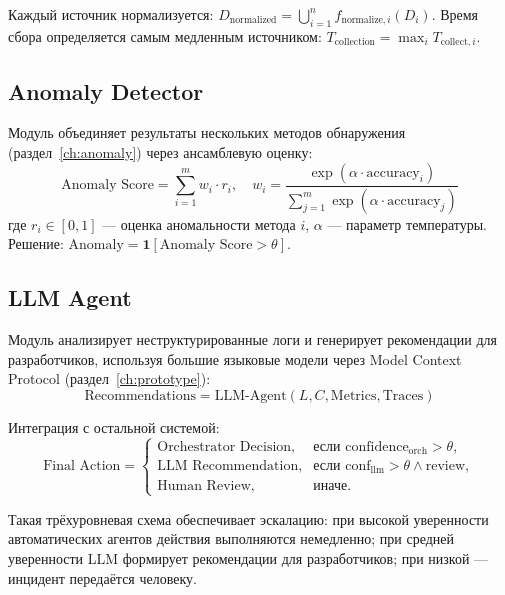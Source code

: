 Каждый источник нормализуется: $D_{\text{normalized}} = \bigcup_{i=1}^{n} f_{\text{normalize},i}(D_i)$. \linebreak Время сбора определяется самым медленным источником: $T_{\text{collection}} = \max_{i} T_{\text{collect},i}$.

\subsection{Anomaly Detector}

Модуль объединяет результаты нескольких методов обнаружения (раздел~\ref{ch:anomaly}) через ансамблевую оценку:
\begin{equation}
\text{Anomaly Score} = \sum_{i=1}^{m} w_i \cdot r_i, \quad w_i = \frac{\exp(\alpha \cdot \text{accuracy}_i)}{\sum_{j=1}^{m} \exp(\alpha \cdot \text{accuracy}_j)}
\label{eq:ensemble_anomaly}
\end{equation}
где $r_i \in [0, 1]$ --- оценка аномальности метода $i$, $\alpha$ --- параметр температуры. Решение: $\text{Anomaly} = \mathbf{1}[\text{Anomaly Score} > \theta]$.

\subsection{LLM Agent}

Модуль анализирует неструктурированные логи и генерирует рекомендации для разработчиков, используя большие языковые модели через Model Context Protocol (раздел~\ref{ch:prototype}):
\begin{equation}
\text{Recommendations} = \text{LLM-Agent}(L, C, \text{Metrics}, \text{Traces})
\label{eq:llm_agent_recommendations}
\end{equation}

Интеграция с остальной системой:
\begin{equation}
\text{Final Action} =
  \begin{cases}
    \text{Orchestrator Decision},
      & \text{если } \text{confidence}_{\text{orch}} > \theta, \\
    \text{LLM Recommendation},
      & \text{если } \text{conf}_{\text{llm}} > \theta \land \text{review}, \\
    \text{Human Review},
      & \text{иначе}.
  \end{cases}
\label{eq:llm_integration_arch}
\end{equation}

Такая трёхуровневая схема обеспечивает эскалацию: при высокой уверенности автоматических агентов действия выполняются немедленно; при средней уверенности LLM формирует рекомендации для разработчиков; при низкой --- инцидент передаётся человеку.

